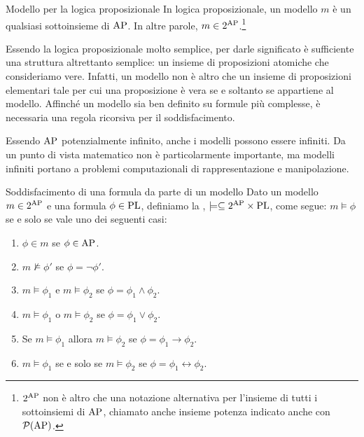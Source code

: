 \begin{definition}{Modello per la logica proposizionale}
  In logica proposizionale, un modello \(m\) è un qualsiasi sottoinsieme di \(\AP\). In altre parole, \(m \in 2^{\AP}\).\footnote{\(2^{\AP}\) non è altro che una notazione alternativa per l'insieme di tutti i sottoinsiemi di \(\AP\), chiamato anche insieme potenza indicato anche con \(\mathcal{P}(\AP)\).}
\end{definition}

Essendo la logica proposizionale molto semplice, per darle significato è sufficiente una struttura altrettanto semplice: un insieme di proposizioni atomiche che consideriamo vere.
Infatti, un modello non è altro che un insieme di proposizioni elementari tale per cui una proposizione è vera se e soltanto se appartiene al modello.
Affinché un modello sia ben definito su formule più complesse, è necessaria una regola ricorsiva per il soddisfacimento.

\begin{note}{}
Essendo \(\AP\) potenzialmente infinito, anche i modelli possono essere infiniti. Da un punto di vista matematico non è particolarmente importante, ma modelli infiniti portano a problemi computazionali di rappresentazione e manipolazione.
\end{note}

\begin{definition}{Soddisfacimento di una formula da parte di un modello}
  Dato un modello \(m \in 2^{\AP}\) e una formula \(\phi \in \operatorname{PL}\), definiamo la , \(\models \subseteq 2^{\AP} \times \PL\), come segue:
  \(m\models \phi \) se e solo se vale uno dei seguenti casi:
  \begin{enumerate}
    \item \(\phi \in m\) se \(\phi \in \AP\).
    \item \(m \not\models \phi'\) se \(\phi = \neg \phi'\).
    \item \(m \models \phi_1\) e \(m \models \phi_2\) se \(\phi = \phi_1 \land \phi_2\).
    \item \(m \models \phi_1\) o \(m \models \phi_2\) se \(\phi = \phi_1 \lor \phi_2\).
    \item Se \(m \models \phi_1\) allora \(m \models \phi_2\) se \(\phi = \phi_1 \rightarrow \phi_2\).
    \item \(m \models \phi_1\) se e solo se \(m \models \phi_2\) se \(\phi = \phi_1 \leftrightarrow \phi_2\).
  \end{enumerate}
\end{definition}

